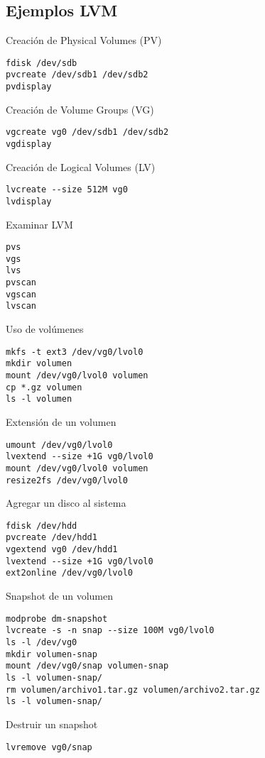 
\subsection{Ejemplos LVM}
\label{sub:ejemplosLVM}

Creación de Physical Volumes (PV)
\begin{lstlisting}
fdisk /dev/sdb
pvcreate /dev/sdb1 /dev/sdb2
pvdisplay
\end{lstlisting}

Creación de Volume Groups (VG)
\begin{lstlisting}
vgcreate vg0 /dev/sdb1 /dev/sdb2
vgdisplay
\end{lstlisting}

Creación de Logical Volumes (LV)
\begin{lstlisting}
lvcreate --size 512M vg0
lvdisplay
\end{lstlisting}

Examinar LVM
\begin{lstlisting}
pvs
vgs
lvs
pvscan
vgscan
lvscan
\end{lstlisting}

Uso de volúmenes
\begin{lstlisting}
mkfs -t ext3 /dev/vg0/lvol0
mkdir volumen
mount /dev/vg0/lvol0 volumen
cp *.gz volumen
ls -l volumen
\end{lstlisting}

Extensión de un volumen
\begin{lstlisting}
umount /dev/vg0/lvol0
lvextend --size +1G vg0/lvol0
mount /dev/vg0/lvol0 volumen
resize2fs /dev/vg0/lvol0 
\end{lstlisting}

Agregar un disco al sistema
\begin{lstlisting}
fdisk /dev/hdd
pvcreate /dev/hdd1
vgextend vg0 /dev/hdd1
lvextend --size +1G vg0/lvol0 
ext2online /dev/vg0/lvol0 
\end{lstlisting}

Snapshot de un volumen
\begin{lstlisting}
modprobe dm-snapshot
lvcreate -s -n snap --size 100M vg0/lvol0
ls -l /dev/vg0
mkdir volumen-snap
mount /dev/vg0/snap volumen-snap
ls -l volumen-snap/
rm volumen/archivo1.tar.gz volumen/archivo2.tar.gz
ls -l volumen-snap/
\end{lstlisting}

Destruir un snapshot
\begin{lstlisting}
lvremove vg0/snap
\end{lstlisting}

